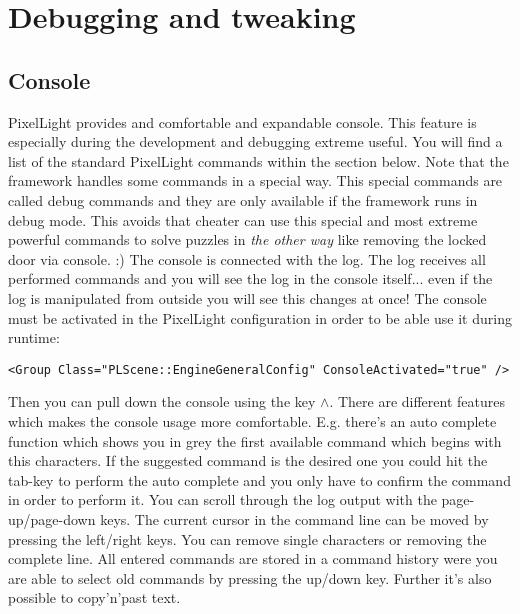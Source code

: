 \section{Debugging and tweaking}




\subsection{Console}
PixelLight provides and comfortable and expandable console. This feature is especially during the development and debugging extreme useful. You will find a list of the standard PixelLight commands within the section below. Note that the framework handles some commands in a special way. This special commands are called debug commands and they are only available if the framework runs in debug mode. This avoids that cheater can use this special and most extreme powerful commands to solve puzzles in \emph{the other way} like removing the locked door via console. :) The console is connected with the log. The log receives all performed commands and you will see the log in the console itself... even if the log is manipulated from outside you will see this changes at once! The console must be activated in the PixelLight configuration in order to be able use it during runtime:

\begin{lstlisting}[caption=Activate the console within the PixelLight configuration]
<Group Class="PLScene::EngineGeneralConfig" ConsoleActivated="true" />
\end{lstlisting}

Then you can pull down the console using the key \(\land\). There are different features which makes the console usage more comfortable. E.g. there's an auto complete function which shows you in grey the first available command which begins with this characters. If the suggested command is the desired one you could hit the tab-key to perform the auto complete and you only have to confirm the command in order to perform it. You can scroll through the log output with the page-up/page-down keys. The current cursor in the command line can be moved by pressing the left/right keys. You can remove single characters or removing the complete line. All entered commands are stored in a command history were you are able to select old commands by pressing the up/down key. Further it's also possible to copy'n'past text.




